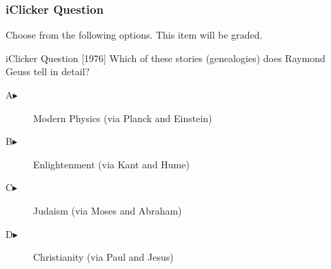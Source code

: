 \begin{frame}
  \frametitle{iClicker Question}
Choose from the following options. This item will be graded.
\begin{block}{iClicker Question}
[1976] Which of these stories (genealogies) does Raymond Geuss tell in detail?
\end{block}
\begin{description}
\item[A\hspace{.2in}$\blacktriangleright$] Modern Physics (via Planck and Einstein)
\item[B\hspace{.2in}$\blacktriangleright$] Enlightenment (via Kant and Hume)
\item[C\hspace{.2in}$\blacktriangleright$] Judaism (via Moses and Abraham)
\item[D\hspace{.2in}$\blacktriangleright$] Christianity (via Paul and Jesus)
\end{description}
\end{frame}